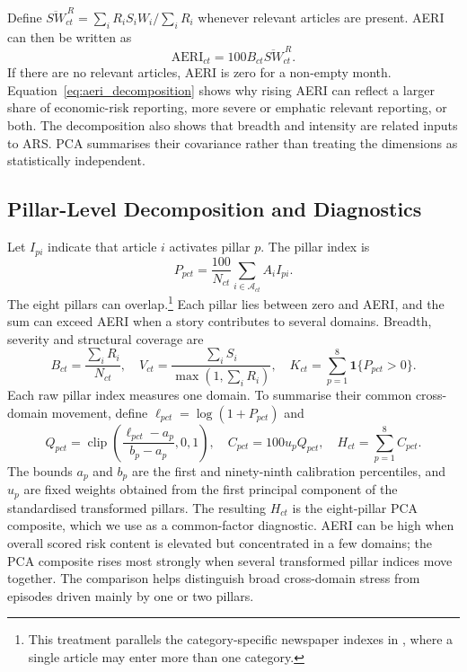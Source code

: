 \documentclass[12pt]{article}
\newcommand{\clip}{\operatorname{clip}}
\newcommand{\ind}{\mathbf{1}}
\begin{document}
Define $\overline{SW}_{ct}^{\,R}=\sum_iR_iS_iW_i/\sum_iR_i$ whenever relevant articles are present. AERI can then be written as
\begin{equation}
 \mathrm{AERI}_{ct}=100B_{ct}\overline{SW}_{ct}^{\,R}.\label{eq:aeri_decomposition}
\end{equation}
If there are no relevant articles, AERI is zero for a non-empty month. Equation~\eqref{eq:aeri_decomposition} shows why rising AERI can reflect a larger share of economic-risk reporting, more severe or emphatic relevant reporting, or both. The decomposition also shows that breadth and intensity are related inputs to ARS. PCA summarises their covariance rather than treating the dimensions as statistically independent.
\subsection{Pillar-Level Decomposition and Diagnostics}\label{sec:pillars_diagnostics}
Let $I_{pi}$ indicate that article $i$ activates pillar $p$. The pillar index is
\begin{equation}P_{pct}=\frac{100}{N_{ct}}\sum_{i\in\mathcal A_{ct}}A_iI_{pi}.\label{eq:pillar}\end{equation}
The eight pillars can overlap.\footnote{This treatment parallels the category-specific newspaper indexes in \citet{baker2016}, where a single article may enter more than one category.} Each pillar lies between zero and AERI, and the sum can exceed AERI when a story contributes to several domains. Breadth, severity and structural coverage are
\begin{equation}B_{ct}=\frac{\sum_iR_i}{N_{ct}},\quad V_{ct}=\frac{\sum_iS_i}{\max(1,\sum_iR_i)},\quad K_{ct}=\sum_{p=1}^{8}\ind\{P_{pct}>0\}.\label{eq:diagnostics}\end{equation}
Each raw pillar index measures one domain. To summarise their common cross-domain movement, define $\ell_{pct}=\log(1+P_{pct})$ and
\begin{equation}Q_{pct}=\clip\left(\frac{\ell_{pct}-a_p}{b_p-a_p},0,1\right),\quad C_{pct}=100u_pQ_{pct},\quad H_{ct}=\sum_{p=1}^{8}C_{pct}.\label{eq:pca_pillars}\end{equation}
The bounds $a_p$ and $b_p$ are the first and ninety-ninth calibration percentiles, and $u_p$ are fixed weights obtained from the first principal component of the standardised transformed pillars. The resulting $H_{ct}$ is the eight-pillar PCA composite, which we use as a common-factor diagnostic. AERI can be high when overall scored risk content is elevated but concentrated in a few domains; the PCA composite rises most strongly when several transformed pillar indices move together. The comparison helps distinguish broad cross-domain stress from episodes driven mainly by one or two pillars.
\end{document}
